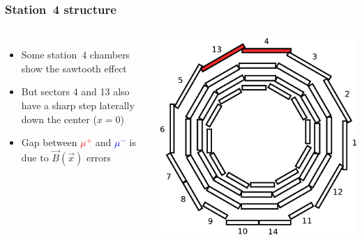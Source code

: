 \documentclass[compress]{beamer}
\begin{document}
\begin{frame}
\frametitle{Station~4 structure}

\vspace{0.5 cm}
\begin{columns}
\begin{itemize}
\item Some station~4 chambers show the sawtooth effect
\item But sectors 4 and 13 also have a sharp step laterally down the center ($x=0$)
\item Gap between \textcolor{red}{$\mu^+$} and \textcolor{blue}{$\mu^-$} is due to $\vec{B}(\vec{x})$ errors
\end{itemize}

\includegraphics[width=\linewidth]{location_of_04_13.pdf}
\end{columns}


\end{frame}
\end{document}
